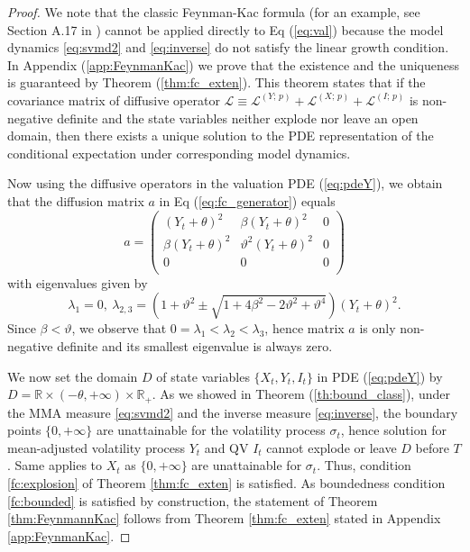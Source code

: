 \documentclass[11pt,a4paper] {article}
\begin{document}
\begin{proof}
We note that the classic Feynman-Kac formula (for an example, see Section A.17 in \cite{Musiela2009}) cannot be applied directly to Eq (\ref{eq:val}) because the model dynamics \eqref{eq:svmd2} and \eqref{eq:inverse} do not satisfy the linear growth condition. In Appendix (\ref{app:FeynmanKac}) we prove that the existence and the uniqueness is guaranteed by Theorem (\ref{thm:fc_exten}). This theorem states that if the covariance matrix of diffusive operator $\mathcal{L} \equiv \mathcal{L}^{(Y;\,p)} + \mathcal{L}^{(X;\,p)} + \mathcal{L}^{(I;\,p)}$ is non-negative definite and the state variables neither explode nor leave an open domain, then there exists a unique solution to the PDE representation of the conditional expectation under corresponding model dynamics.

Now using the diffusive operators in the valuation PDE (\ref{eq:pdeY}), we obtain that the diffusion matrix $a$ in Eq (\ref{eq:fc_generator}) equals
\begin{equation}
a=
\begin{pmatrix} 
(Y_t+\theta)^2 & \beta(Y_t+\theta)^2 & 0\\ 
\beta(Y_t+\theta)^2 & \vartheta^2(Y_t+\theta)^2 & 0\\ 
0 & 0 & 0\\ 
\end{pmatrix}
\end{equation}
with eigenvalues given by
\begin{equation*}
\lambda_1=0, \ \lambda_{2,3}=\left(1+\vartheta^2\pm\sqrt{1+4\beta^2-2\vartheta^2+\vartheta^4}\right)(Y_t+\theta)^2.
\end{equation*}
Since $\beta<\vartheta$, we observe that $0=\lambda_1<\lambda_2<\lambda_3$, hence matrix $a$ is only non-negative definite and its smallest eigenvalue is always zero. 

We now set the domain $D$ of state variables $\{X_t, Y_t, I_t\}$ in PDE (\ref{eq:pdeY}) by $D=\mathbb{R}\times (-\theta, +\infty)\times \mathbb{R}_+$. 
As we showed in Theorem (\ref{th:bound_class}), under the MMA measure \eqref{eq:svmd2} and the inverse measure \eqref{eq:inverse}, the boundary points $\{0, +\infty\}$ are unattainable for the volatility process $\sigma_t$, hence solution for mean-adjusted volatility process $Y_t$ and QV $I_t$ cannot explode or leave $D$ before $T$. Same applies to $X_t$ as $\{0, +\infty\}$ are unattainable for $\sigma_t$.  Thus, condition \ref{fc:explosion} of Theorem \ref{thm:fc_exten} is satisfied. 
As boundedness condition \ref{fc:bounded}  is satisfied by construction, the statement of Theorem \ref{thm:FeynmannKac} follows from Theorem \ref{thm:fc_exten} stated in Appendix \ref{app:FeynmanKac}.

\end{proof}
\end{document}
